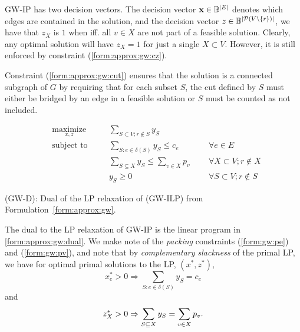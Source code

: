  GW-IP has two decision vectors. The decision vector $\mathbf{x} \in \mathbb{B}^{|E|}$ denotes which edges are contained in the solution,
 and the decision vector $z \in \mathbb{B}^{|\mathcal P (V \setminus \{r\}) |}$, we have that $z_X$ is
 $1$ when iff. all $v \in X$ are not part of a feasible solution. Clearly, any optimal solution will have $z_X = 1$ for just a single
 $X \subset V$. However, it is still enforced by constraint (\ref{form:approx:gw:cz}).

 Constraint (\ref{form:approx:gw:cut})
 ensures that the solution is a connected subgraph of $G$ by requiring that for each subset $S$, the cut defined by $S$ must either be
 bridged by an edge in a feasible solution or $S$ must be counted as not included.

 \begin{formulation}[h!]
   \begin{subequations}
     \begin{alignat}{3} 
       &\underset{x, z}{\text{maximize}}
       & & \sum_{S \subset V; r \not\in S} y_S & \\
       & \text{subject to}\quad
       & & \sum_{S: e \in \delta(S)} y_S \leq c_e \qquad&& \forall e \in E \label{form:gw:pe}\\
       &&& \sum_{S \subseteq X} y_S \leq \sum_{v \in X} p_v  && \forall X \subset V; r \not\in X \label{form:gw:pv} \\
       &&& y_S \geq 0  && \forall S \subset V; r \not\in S
     \end{alignat}\label{form:approx:gw:dual}
   \end{subequations}
   \caption{(GW-D): Dual of the LP relaxation of (GW-ILP) from Formulation~\ref{form:approx:gw}.}
 \end{formulation}
 
 The dual to the LP relaxation of GW-IP is the linear program in \ref{form:approx:gw:dual}. We make note of the
 \textit{packing} constraints (\ref{form:gw:pe}) and (\ref{form:gw:pv}), and note that by \textit{complementary slackness}
 \citep{chvatal1983linear}
 of the primal LP, we have for optimal primal solutions to the LP, $(x^*, z^*)$,
 \[x^*_e > 0 \Rightarrow \sum_{S: e \in \delta(S)} y_S = c_e\]
 and
 \[z^*_X > 0 \Rightarrow \sum_{S \subseteq X} y_S = \sum_{v \in X} p_v\mathnormal{.}\]
 
 
